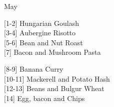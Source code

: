 		\begin{menu}{May}
    
    \begin{recipelist}
    
        {\scriptsize[1-2]} Hungarian Goulash\\
        {\scriptsize[3-4]} Aubergine Risotto\\
        {\scriptsize[5-6]} Bean and Nut Roast\\
        {\scriptsize[7]} Bacon and Mushroom Pasta\\%
    \end{recipelist}%
    \begin{recipelist}
    
        {\scriptsize[8-9]} Banana Curry\\
        {\scriptsize[10-11]} Mackerell and Potato Hash\\
        {\scriptsize[12-13]} Beans and Bulgur Wheat\\
        {\scriptsize[14]} Egg, bacon and Chips\\%
    \end{recipelist}\par%
  

\end{menu}
